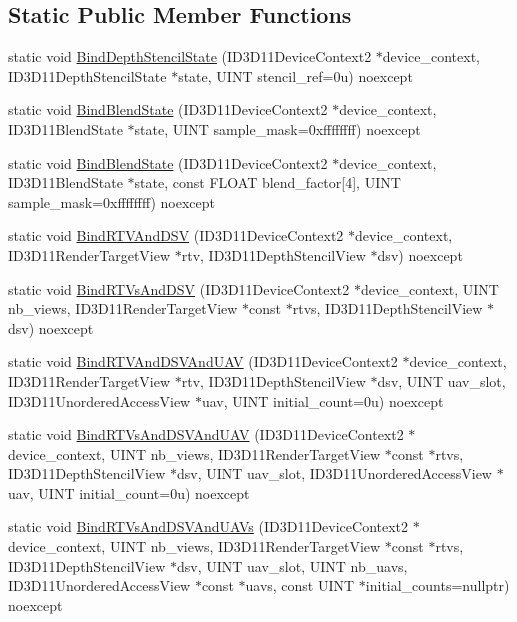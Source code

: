 \subsection*{Static Public Member Functions}
\begin{DoxyCompactItemize}
\item 
static void \hyperlink{structmage_1_1_o_m_a14f6a3fcf0678bf2092d443b06b3a925}{Bind\+Depth\+Stencil\+State} (I\+D3\+D11\+Device\+Context2 $\ast$device\+\_\+context, I\+D3\+D11\+Depth\+Stencil\+State $\ast$state, U\+I\+NT stencil\+\_\+ref=0u) noexcept
\item 
static void \hyperlink{structmage_1_1_o_m_aa0ab164522c95b983254718a17f8304e}{Bind\+Blend\+State} (I\+D3\+D11\+Device\+Context2 $\ast$device\+\_\+context, I\+D3\+D11\+Blend\+State $\ast$state, U\+I\+NT sample\+\_\+mask=0xffffffff) noexcept
\item 
static void \hyperlink{structmage_1_1_o_m_a1d28a8b67f3760107cfc4e8ae7fe78fa}{Bind\+Blend\+State} (I\+D3\+D11\+Device\+Context2 $\ast$device\+\_\+context, I\+D3\+D11\+Blend\+State $\ast$state, const F\+L\+O\+AT blend\+\_\+factor\mbox{[}4\mbox{]}, U\+I\+NT sample\+\_\+mask=0xffffffff) noexcept
\item 
static void \hyperlink{structmage_1_1_o_m_a6c031fe0e62dfee63463f05e3fb63f97}{Bind\+R\+T\+V\+And\+D\+SV} (I\+D3\+D11\+Device\+Context2 $\ast$device\+\_\+context, I\+D3\+D11\+Render\+Target\+View $\ast$rtv, I\+D3\+D11\+Depth\+Stencil\+View $\ast$dsv) noexcept
\item 
static void \hyperlink{structmage_1_1_o_m_ab296a9a3c4355437c8ef1008b2938112}{Bind\+R\+T\+Vs\+And\+D\+SV} (I\+D3\+D11\+Device\+Context2 $\ast$device\+\_\+context, U\+I\+NT nb\+\_\+views, I\+D3\+D11\+Render\+Target\+View $\ast$const $\ast$rtvs, I\+D3\+D11\+Depth\+Stencil\+View $\ast$dsv) noexcept
\item 
static void \hyperlink{structmage_1_1_o_m_af4d9441b3a8d905debeb46e6bdcdcd3f}{Bind\+R\+T\+V\+And\+D\+S\+V\+And\+U\+AV} (I\+D3\+D11\+Device\+Context2 $\ast$device\+\_\+context, I\+D3\+D11\+Render\+Target\+View $\ast$rtv, I\+D3\+D11\+Depth\+Stencil\+View $\ast$dsv, U\+I\+NT uav\+\_\+slot, I\+D3\+D11\+Unordered\+Access\+View $\ast$uav, U\+I\+NT initial\+\_\+count=0u) noexcept
\item 
static void \hyperlink{structmage_1_1_o_m_a0cacb7ef07da3ce8124901c3db58be33}{Bind\+R\+T\+Vs\+And\+D\+S\+V\+And\+U\+AV} (I\+D3\+D11\+Device\+Context2 $\ast$device\+\_\+context, U\+I\+NT nb\+\_\+views, I\+D3\+D11\+Render\+Target\+View $\ast$const $\ast$rtvs, I\+D3\+D11\+Depth\+Stencil\+View $\ast$dsv, U\+I\+NT uav\+\_\+slot, I\+D3\+D11\+Unordered\+Access\+View $\ast$uav, U\+I\+NT initial\+\_\+count=0u) noexcept
\item 
static void \hyperlink{structmage_1_1_o_m_a7abfd505e3b2c5d9bf87b8a70fdc4c51}{Bind\+R\+T\+Vs\+And\+D\+S\+V\+And\+U\+A\+Vs} (I\+D3\+D11\+Device\+Context2 $\ast$device\+\_\+context, U\+I\+NT nb\+\_\+views, I\+D3\+D11\+Render\+Target\+View $\ast$const $\ast$rtvs, I\+D3\+D11\+Depth\+Stencil\+View $\ast$dsv, U\+I\+NT uav\+\_\+slot, U\+I\+NT nb\+\_\+uavs, I\+D3\+D11\+Unordered\+Access\+View $\ast$const $\ast$uavs, const U\+I\+NT $\ast$initial\+\_\+counts=nullptr) noexcept
\end{DoxyCompactItemize}
